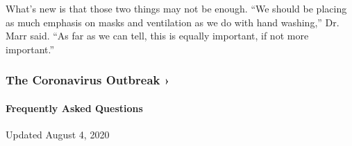 What's new is that those two things may not be enough. ``We should be
placing as much emphasis on masks and ventilation as we do with hand
washing,'' Dr. Marr said. ``As far as we can tell, this is equally
important, if not more important.''

\href{https://www.nytimes3xbfgragh.onion/news-event/coronavirus?action=click\&pgtype=Article\&state=default\&region=MAIN_CONTENT_3\&context=storylines_faq}{}

\hypertarget{the-coronavirus-outbreak-}{%
\subsubsection{The Coronavirus Outbreak
›}\label{the-coronavirus-outbreak-}}

\hypertarget{frequently-asked-questions}{%
\paragraph{Frequently Asked
Questions}\label{frequently-asked-questions}}

Updated August 4, 2020


